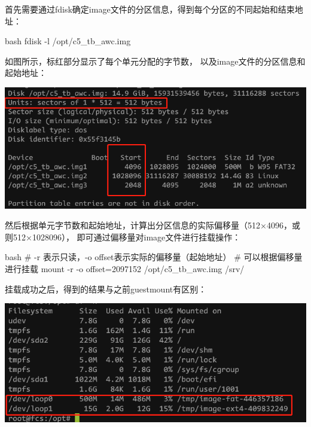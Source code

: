\begin{outline}[enumerate]
首先需要通过fdisk确定image文件的分区信息，得到每个分区的不同起始和结束地址：
\begin{code-block}{bash}
fdisk -l /opt/c5_tb_awc.img
\end{code-block}

如图所示，标红部分显示了每个单元分配的字节数，
以及image文件的分区信息和起始地址：
\par\begin{minipage}{\linewidth}
  \centering
  \includegraphics[width=\linewidth]{imagefile.png}
  \label{fig:imagefile}
\end{minipage}

然后根据单元字节数和起始地址，计算出分区信息的实际偏移量（512×4096，或则512×1028096），
即可通过偏移量对image文件进行挂载操作：
\begin{code-block}{bash}
# -r 表示只读，-o offset表示实际的偏移量（起始地址）
# 可以根据偏移量进行挂载
mount -r -o offset=2097152 /opt/c5_tb_awc.img /srv/
\end{code-block}

挂载成功之后，得到的结果与之前guestmount有区别：
\par\begin{minipage}{\linewidth}
  \centering
  \includegraphics[width=\linewidth]{offset_mount.png}
  \label{fig:offset_mount}
\end{minipage}


\end{outline}
